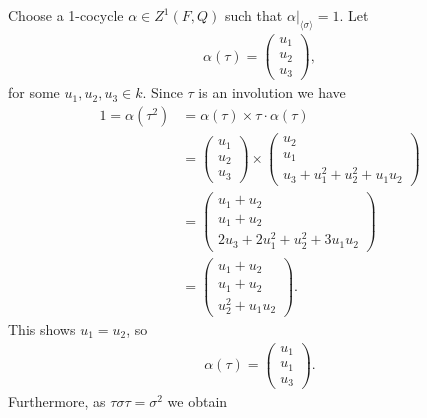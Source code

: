 Choose a 1-cocycle $\alpha \in Z^1(F, Q)$ such that $\alpha|_{\langle \sigma \rangle} = 1$. Let
\begin{align*}
	\alpha(\tau) = \left(\begin{matrix} u_1 \\ u_2 \\ u_3 \end{matrix} \right),
\end{align*}
for some $u_1, u_2, u_3 \in k$. Since $\tau$ is an involution we have
\begin{align*}
	1 = \alpha(\tau^2) &= \alpha(\tau) \times \tau\cdot\alpha(\tau)\\
	&= \left(\begin{matrix} u_1 \\ u_2 \\ u_3\end{matrix} \right) \times 
	\left(\begin{matrix} u_2 \\ u_1 \\ u_3 + u_1^2 + u_2^2 + u_1u_2\end{matrix} \right) \\
	&= \left(\begin{matrix} u_1 + u_2 \\ u_1 + u_2 \\ 2u_3 + 2u_1^2 + u_2^2 + 3u_1u_2\end{matrix} \right)\\
	&= \left(\begin{matrix} u_1 + u_2 \\ u_1 + u_2 \\ u_2^2 + u_1u_2\end{matrix} \right).
\end{align*}
This shows $u_1 = u_2$, so
\begin{align*}
	\alpha(\tau) = \left(\begin{matrix} u_1 \\ u_1 \\ u_3\end{matrix} \right).
\end{align*}
Furthermore, as $\tau\sigma\tau = \sigma^2$ we obtain
